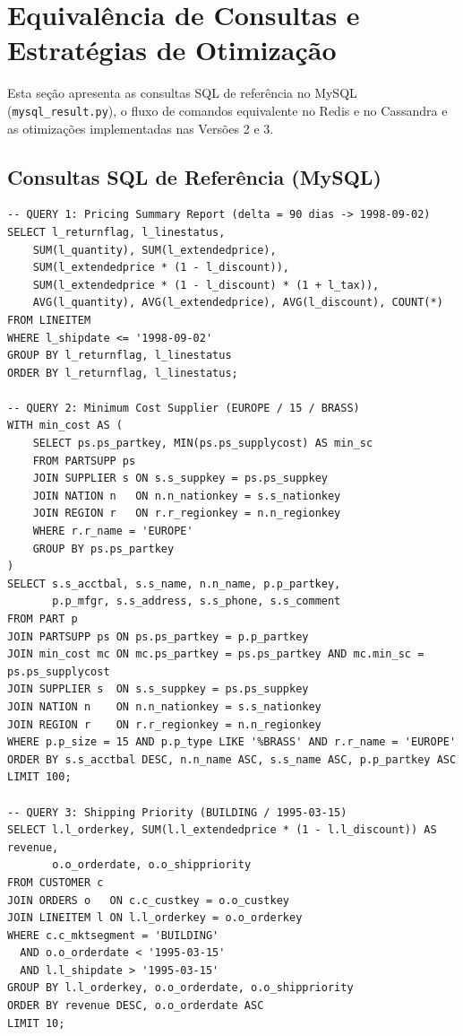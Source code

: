 \documentclass[12pt,a4paper]{article}
\begin{document}
\newpage

\section{Equivalência de Consultas e Estratégias de Otimização}

Esta seção apresenta as consultas SQL de referência no MySQL (\texttt{mysql\_result.py}), o fluxo de comandos equivalente no Redis e no Cassandra e as otimizações implementadas nas Versões 2 e 3.

\subsection{Consultas SQL de Referência (MySQL)}

\begin{lstlisting}[caption={Queries 1, 2 e 3 executadas no MySQL como gabarito (\textit{ground truth}) em \texttt{mysql\_result.py}.}]
-- QUERY 1: Pricing Summary Report (delta = 90 dias -> 1998-09-02)
SELECT l_returnflag, l_linestatus,
    SUM(l_quantity), SUM(l_extendedprice),
    SUM(l_extendedprice * (1 - l_discount)),
    SUM(l_extendedprice * (1 - l_discount) * (1 + l_tax)),
    AVG(l_quantity), AVG(l_extendedprice), AVG(l_discount), COUNT(*)
FROM LINEITEM
WHERE l_shipdate <= '1998-09-02'
GROUP BY l_returnflag, l_linestatus
ORDER BY l_returnflag, l_linestatus;

-- QUERY 2: Minimum Cost Supplier (EUROPE / 15 / BRASS)
WITH min_cost AS (
    SELECT ps.ps_partkey, MIN(ps.ps_supplycost) AS min_sc
    FROM PARTSUPP ps
    JOIN SUPPLIER s ON s.s_suppkey = ps.ps_suppkey
    JOIN NATION n   ON n.n_nationkey = s.s_nationkey
    JOIN REGION r   ON r.r_regionkey = n.n_regionkey
    WHERE r.r_name = 'EUROPE'
    GROUP BY ps.ps_partkey
)
SELECT s.s_acctbal, s.s_name, n.n_name, p.p_partkey,
       p.p_mfgr, s.s_address, s.s_phone, s.s_comment
FROM PART p
JOIN PARTSUPP ps ON ps.ps_partkey = p.p_partkey
JOIN min_cost mc ON mc.ps_partkey = ps.ps_partkey AND mc.min_sc = ps.ps_supplycost
JOIN SUPPLIER s  ON s.s_suppkey = ps.ps_suppkey
JOIN NATION n    ON n.n_nationkey = s.s_nationkey
JOIN REGION r    ON r.r_regionkey = n.n_regionkey
WHERE p.p_size = 15 AND p.p_type LIKE '%BRASS' AND r.r_name = 'EUROPE'
ORDER BY s.s_acctbal DESC, n.n_name ASC, s.s_name ASC, p.p_partkey ASC
LIMIT 100;

-- QUERY 3: Shipping Priority (BUILDING / 1995-03-15)
SELECT l.l_orderkey, SUM(l.l_extendedprice * (1 - l.l_discount)) AS revenue,
       o.o_orderdate, o.o_shippriority
FROM CUSTOMER c
JOIN ORDERS o   ON c.c_custkey = o.o_custkey
JOIN LINEITEM l ON l.l_orderkey = o.o_orderkey
WHERE c.c_mktsegment = 'BUILDING'
  AND o.o_orderdate < '1995-03-15'
  AND l.l_shipdate > '1995-03-15'
GROUP BY l.l_orderkey, o.o_orderdate, o.o_shippriority
ORDER BY revenue DESC, o.o_orderdate ASC
LIMIT 10;
\end{lstlisting}
\end{document}
